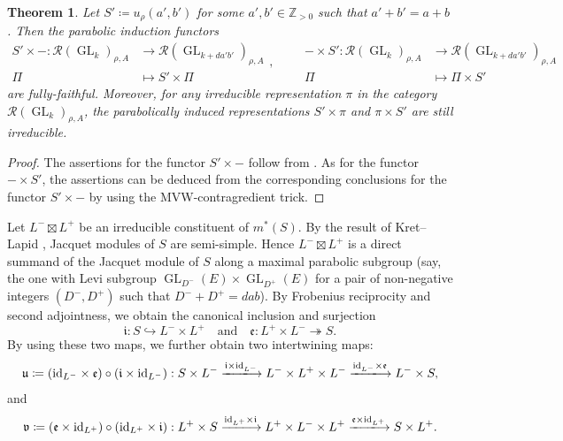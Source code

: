 \documentclass[11pt,letterpaper]{amsart}
\theoremstyle{plain}
\newcounter{theorem}[section]
\numberwithin{theorem}{section}
\numberwithin{equation}{subsection}
\newtheorem{Thm}[theorem]{Theorem}
\theoremstyle{remark}
\newcommand{\GL}{\operatorname{GL}}
\newcommand{\Z}{\mathbb{Z}}
\def\calR{\mathcal{R}}
\def\lra{\longrightarrow}
\begin{document}
\begin{Thm}\label{T:ProdFunctorFullyFaithfulApp}
Let $S'\coloneqq u_\rho\left(a',b'\right)$ for some $a',b'\in\Z_{>0}$ such that $a'+b'=a+b$. Then the parabolic induction functors
\[
    \begin{aligned}
       S'\times-: \calR\left(\GL_k\right)_{\rho,A} &\lra \calR\left(\GL_{k+da'b'}\right)_{\rho,A}\\
       \Pi &\longmapsto S'\times\Pi
    \end{aligned},
    \qquad
    \begin{aligned}
       -\times S': \calR\left(\GL_k\right)_{\rho,A} &\lra \calR\left(\GL_{k+da'b'}\right)_{\rho,A}\\
       \Pi &\longmapsto \Pi\times S'
    \end{aligned}
\] 
are fully-faithful. Moreover, for any irreducible representation $\pi$ in the category $\calR\left(\GL_k\right)_{\rho,A}$, the parabolically induced representations $S'\times\pi$ and $\pi\times S'$ are still irreducible.  
\end{Thm}

\vskip 5pt

\begin{proof}
The assertions for the functor $S'\times-$ follow from \cite[Lem. 8.5, Thm. 9.1]{MR4373242}. 
As for the functor $-\times S'$, the assertions can be deduced from the corresponding conclusions for the functor $S'\times-$ by using the MVW-contragredient trick.
 
\end{proof}

\vskip 5pt

Let $L^-\boxtimes L^+$ be an irreducible constituent of $m^*\left(S\right)$. By the result of Kret--Lapid \cite[Cor. 2.2]{MR2996769}, Jacquet modules of $S$ are semi-simple. Hence $L^-\boxtimes L^+$ is a direct summand of the Jacquet module of $S$ along a maximal parabolic subgroup (say, the one with Levi subgroup $\GL_{D^-}\left(E\right)\times \GL_{D^+}\left(E\right)$ for a pair of non-negative integers $\left(D^-,D^+\right)$ such that $D^-+D^+=dab$). By Frobenius reciprocity and second adjointness, we obtain the canonical inclusion and surjection
\[
    \mathfrak{i}: S\hookrightarrow L^-\times L^+ \quad \text{and} \quad \mathfrak{e}: L^+\times L^-\twoheadrightarrow S.
\]
By using these two maps, we further obtain two intertwining maps:
\[
    \mathfrak{u}\coloneqq \left({\rm id}_{L^-}\times\mathfrak{e}\right)\circ\left(\mathfrak{i}\times {\rm id}_{L^-}\right): S\times L^- \xlongrightarrow{\mathfrak{i}\times {\rm id}_{L^-}} L^-\times L^+\times L^- \xlongrightarrow{{\rm id}_{L^-}\times\mathfrak{e}} L^-\times S,
\]
and
\[
    \mathfrak{v}\coloneqq \left(\mathfrak{e}\times {{\rm id}_{L^+}}\right)\circ\left({\rm id}_{L^+}\times\mathfrak{i}\right): L^+\times S \xlongrightarrow{{\rm id}_{L^+}\times\mathfrak{i}} L^+\times L^-\times L^+ \xlongrightarrow{\mathfrak{e}\times {{\rm id}_{L^+}}} S\times L^+.
\]
\end{document}
